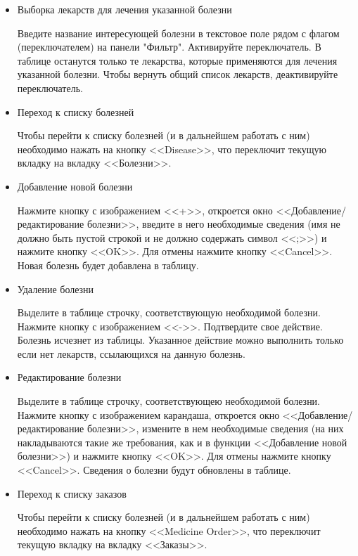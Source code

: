 \begin{itemize}
    \item Выборка лекарств для лечения указанной болезни

        Введите название интересующей болезни в текстовое поле рядом с флагом
        (переключателем) на панели "Фильтр". Активируйте переключатель. В
        таблице останутся только те лекарства, которые применяются для лечения
        указанной болезни. Чтобы вернуть общий список лекарств, деактивируйте
        переключатель.

    \item Переход к списку болезней

        Чтобы перейти к списку болезней (и в дальнейшем работать с ним)
        необходимо нажать на кнопку <<Disease>>, что переключит текущую вкладку
        на вкладку <<Болезни>>.

    \item Добавление новой болезни

        Нажмите кнопку с изображением <<+>>, откроется окно
        <<Добавление/редактирование болезни>>, введите в него необходимые
        сведения (имя не должно быть пустой строкой и не должно содержать
        символ <<;>>) и нажмите кнопку <<OK>>. Для отмены нажмите кнопку
        <<Cancel>>. Новая болезнь будет добавлена в таблицу.

    \item Удаление болезни

        Выделите в таблице строчку, соответствующую необходимой болезни.
        Нажмите кнопку с изображением <<->>. Подтвердите свое действие.
        Болезнь исчезнет из таблицы. Указанное действие можно выполнить только
        если нет лекарств, ссылающихся на данную болезнь.

    \item Редактирование болезни

        Выделите в таблице строчку, соответствующею необходимой болезни.
        Нажмите кнопку с изображением карандаша, откроется окно
        <<Добавление/редактирование болезни>>, измените в нем необходимые
        сведения (на них накладываются такие же требования, как и в функции
        <<Добавление новой болезни>>) и нажмите кнопку <<OK>>. Для отмены
        нажмите кнопку <<Cancel>>. Сведения о болезни будут обновлены в
        таблице.

    \item Переход к списку заказов

        Чтобы перейти к списку болезней (и в дальнейшем работать с ним)
        необходимо нажать на кнопку <<Medicine Order>>, что переключит текущую
        вкладку на вкладку <<Заказы>>.


\end{itemize}
